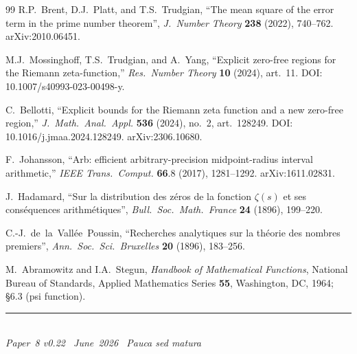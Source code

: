 \documentclass[11pt]{article}
\begin{document}
\begin{thebibliography}{99}
R.P.~Brent, D.J.~Platt, and T.S.~Trudgian,
``The mean square of the error term in the prime number theorem'',
\emph{J.\ Number Theory} \textbf{238} (2022), 740--762.
arXiv:2010.06451.

M.J.~Mossinghoff, T.S.~Trudgian, and A.~Yang,
``Explicit zero-free regions for the Riemann zeta-function,''
\textit{Res.\ Number Theory} \textbf{10} (2024), art.~11.
DOI: 10.1007/s40993-023-00498-y.

C.~Bellotti,
``Explicit bounds for the Riemann zeta function
and a new zero-free region,''
\textit{J.\ Math.\ Anal.\ Appl.} \textbf{536} (2024),
no.~2, art.~128249.
DOI: 10.1016/j.jmaa.2024.128249.
arXiv:2306.10680.

F.~Johansson,
``Arb: efficient arbitrary-precision midpoint-radius interval arithmetic,''
\emph{IEEE Trans.\ Comput.} \textbf{66}.8 (2017), 1281--1292.
arXiv:1611.02831.

J.~Hadamard,
``Sur la distribution des z\'{e}ros de la fonction $\zeta(s)$
et ses cons\'{e}quences arithm\'{e}tiques'',
\emph{Bull.\ Soc.\ Math.\ France} \textbf{24} (1896), 199--220.

C.-J.~de~la~Vall\'{e}e~Poussin,
``Recherches analytiques sur la th\'{e}orie des nombres premiers'',
\emph{Ann.\ Soc.\ Sci.\ Bruxelles} \textbf{20} (1896), 183--256.

M.~Abramowitz and I.A.~Stegun,
\emph{Handbook of Mathematical Functions},
National Bureau of Standards, Applied Mathematics Series \textbf{55},
Washington, DC, 1964; \S6.3 (psi function).

\end{thebibliography}

\enlargethispage{3\baselineskip}
\vspace*{\fill}
\begin{minipage}{\linewidth}
\rule{\linewidth}{0.4pt}\smallskip\\
\small\emph{Paper~8 v0.22 \textperiodcentered\ June~2026
\textperiodcentered\ Pauca sed matura}
\end{minipage}
\end{document}

